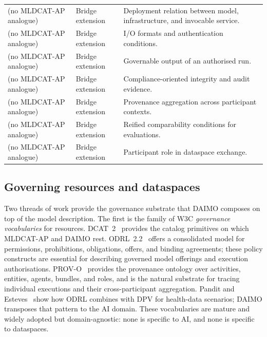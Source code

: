 \documentclass[Afour,sagev,times]{sagej}
\begin{document}
\begin{table}[t]
\begin{tabular}{@{}p{3.6cm}p{2.4cm}p{8cm}@{}}
(no MLDCAT-AP analogue) & Bridge extension & Deployment relation between model, infrastructure, and invocable service. \\
(no MLDCAT-AP analogue) & Bridge extension & I/O formats and authentication conditions. \\
(no MLDCAT-AP analogue) & Bridge extension & Governable output of an authorised run. \\
(no MLDCAT-AP analogue) & Bridge extension & Compliance-oriented integrity and audit evidence. \\
(no MLDCAT-AP analogue) & Bridge extension & Provenance aggregation across participant contexts. \\
(no MLDCAT-AP analogue) & Bridge extension & Reified comparability conditions for evaluations. \\
(no MLDCAT-AP analogue) & Bridge extension & Participant role in dataspace exchange. \\
\bottomrule
\end{tabular}
\end{table}

\subsection{Governing resources and dataspaces}

Two threads of work provide the governance substrate that DAIMO composes on top of the model description. The first is the family of W3C \emph{governance vocabularies} for resources. DCAT~2~\cite{dcat2} provides the catalog primitives on which MLDCAT-AP and DAIMO rest. ODRL~2.2~\cite{odrl22} offers a consolidated model for permissions, prohibitions, obligations, offers, and binding agreements; these policy constructs are essential for describing governed model offerings and execution authorisations. PROV-O~\cite{provo} provides the provenance ontology over activities, entities, agents, bundles, and roles, and is the natural substrate for tracing individual executions and their cross-participant aggregation. Pandit and Esteves~\cite{pandit-esteves} show how ODRL combines with DPV for health-data scenarios; DAIMO transposes that pattern to the AI domain. These vocabularies are mature and widely adopted but domain-agnostic: none is specific to AI, and none is specific to dataspaces.
\end{document}
